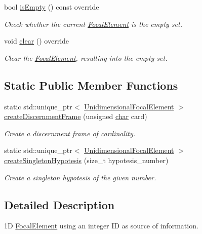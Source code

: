 \begin{DoxyCompactItemize}
bool \hyperlink{classUnidimensionalFocalElement_a836c8a041ffba3e3e2ff7e584469a650}{is\+Empty} () const override
\begin{DoxyCompactList}\small\item\em Check whether the current \hyperlink{classFocalElement}{Focal\+Element} is the empty set. \end{DoxyCompactList}\item 
void \hyperlink{classUnidimensionalFocalElement_a1bd0c21e3e7e5a3ef78f4b47b98b6202}{clear} () override
\begin{DoxyCompactList}\small\item\em Clear the \hyperlink{classFocalElement}{Focal\+Element}, resulting into the empty set. \end{DoxyCompactList}\end{DoxyCompactItemize}
\subsection*{Static Public Member Functions}
\begin{DoxyCompactItemize}
\item 
static std\+::unique\+\_\+ptr$<$ \hyperlink{classUnidimensionalFocalElement}{Unidimensional\+Focal\+Element} $>$ \hyperlink{classUnidimensionalFocalElement_aba30678a3cd2534ea8becf0229fdb399}{create\+Discernment\+Frame} (unsigned \hyperlink{CMakeCache_8txt_afe71f11dacb15682cdc012f7208e6e09}{char} card)
\begin{DoxyCompactList}\small\item\em Create a discernment frame of cardinality. \end{DoxyCompactList}\item 
static std\+::unique\+\_\+ptr$<$ \hyperlink{classUnidimensionalFocalElement}{Unidimensional\+Focal\+Element} $>$ \hyperlink{classUnidimensionalFocalElement_aa99e8f904b1cfdc880b41a36defe8aa5}{create\+Singleton\+Hypotesis} (size\+\_\+t hypotesis\+\_\+number)
\begin{DoxyCompactList}\small\item\em Create a singleton hypotesis of the given number. \end{DoxyCompactList}\end{DoxyCompactItemize}


\subsection{Detailed Description}
1D \hyperlink{classFocalElement}{Focal\+Element} using an integer ID as source of information. 

